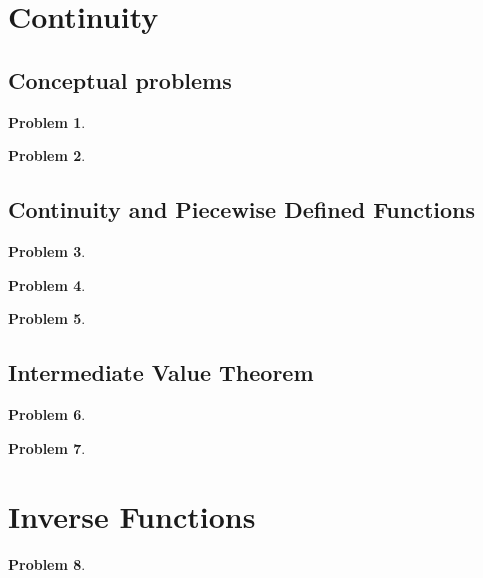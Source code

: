 \documentclass{article}
\newtheorem{problem}{Problem}
\begin{document}
\section{Continuity}
\subsection{Conceptual problems}
\begin{problem}

\end{problem}
\begin{problem}

\end{problem}
\subsection{Continuity and Piecewise Defined Functions}
\begin{problem}

\end{problem}
\begin{problem}

\end{problem}
\begin{problem}

\end{problem}
\subsection{Intermediate Value Theorem}
\begin{problem}

\end{problem}
\begin{problem}

\end{problem}

\section{Inverse Functions}
\begin{problem}

\end{problem}

\end{document}
